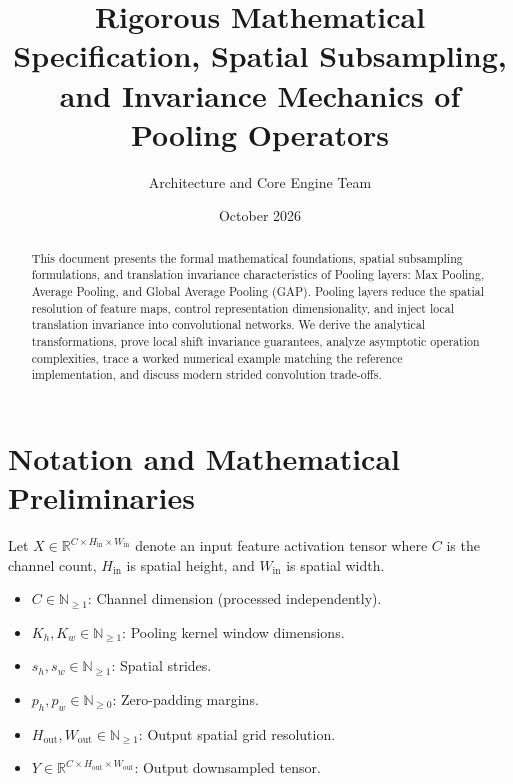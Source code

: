 \documentclass[11pt,a4paper]{article}
\title{\textbf{Rigorous Mathematical Specification, Spatial Subsampling, and Invariance Mechanics of Pooling Operators}}
\author{Architecture and Core Engine Team}
\date{October 2026}
\theoremstyle{definition}
\begin{document}
\maketitle

\begin{abstract}
This document presents the formal mathematical foundations, spatial subsampling formulations, and translation invariance characteristics of Pooling layers: Max Pooling, Average Pooling, and Global Average Pooling (GAP). Pooling layers reduce the spatial resolution of feature maps, control representation dimensionality, and inject local translation invariance into convolutional networks. We derive the analytical transformations, prove local shift invariance guarantees, analyze asymptotic operation complexities, trace a worked numerical example matching the reference implementation, and discuss modern strided convolution trade-offs.
\end{abstract}

\section{Notation and Mathematical Preliminaries}

Let $X \in \mathbb{R}^{C \times H_{\text{in}} \times W_{\text{in}}}$ denote an input feature activation tensor where $C$ is the channel count, $H_{\text{in}}$ is spatial height, and $W_{\text{in}}$ is spatial width.

\begin{itemize}
    \item $C \in \mathbb{N}_{\ge 1}$: Channel dimension (processed independently).
    \item $K_h, K_w \in \mathbb{N}_{\ge 1}$: Pooling kernel window dimensions.
    \item $s_h, s_w \in \mathbb{N}_{\ge 1}$: Spatial strides.
    \item $p_h, p_w \in \mathbb{N}_{\ge 0}$: Zero-padding margins.
    \item $H_{\text{out}}, W_{\text{out}} \in \mathbb{N}_{\ge 1}$: Output spatial grid resolution.
    \item $Y \in \mathbb{R}^{C \times H_{\text{out}} \times W_{\text{out}}}$: Output downsampled tensor.
\end{itemize}
\end{document}

